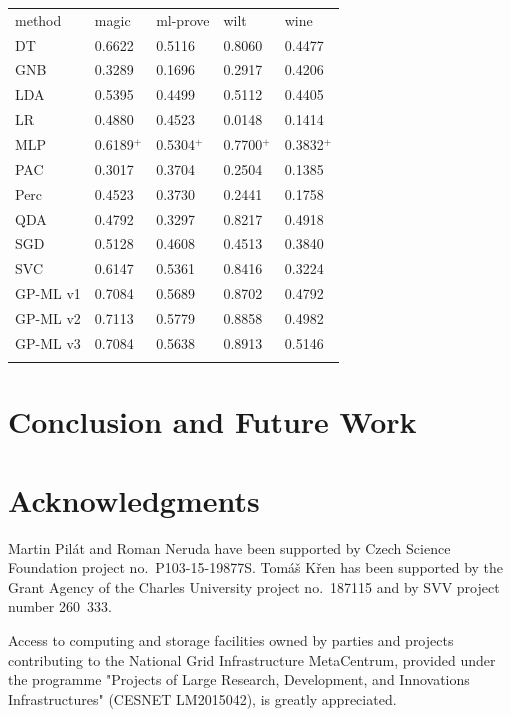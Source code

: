 \documentclass{ws-ijait}
\begin{document}
\begin{table}
{\begin{tabular}{lllll}
\toprule
method 						& magic 	& ml-prove 	& wilt 		& wine      \\
\colrule
DT 							& 0.6622 	& 0.5116 	& 0.8060 	& 0.4477    \\
GNB 						& 0.3289	& 0.1696 	& 0.2917 	& 0.4206    \\
LDA 						& 0.5395 	& 0.4499 	& 0.5112 	& 0.4405    \\
LR 							& 0.4880 	& 0.4523 	& 0.0148 	& 0.1414    \\
MLP 						& 0.6189$^+$& 0.5304$^+$& 0.7700$^+$& 0.3832$^+$\\
PAC 						& 0.3017 	& 0.3704 	& 0.2504 	& 0.1385    \\
Perc 						& 0.4523 	& 0.3730 	& 0.2441 	& 0.1758    \\
QDA 						& 0.4792    & 0.3297 	& 0.8217 	& 0.4918    \\
SGD 						& 0.5128 	& 0.4608 	& 0.4513 	& 0.3840    \\
SVC 						& 0.6147	& 0.5361 	& 0.8416 	& 0.3224    \\
\colrule
GP-ML v1\cite{SSCI2015} 	& 0.7084 	& 0.5689 	& 0.8702 	& 0.4792    \\
GP-ML v2\cite{7814654} 		& 0.7113	& 0.5779	& 0.8858 	& 0.4982    \\
GP-ML v3					& 0.7084	& 0.5638	& 0.8913	& 0.5146    \\			
\botrule
\end{tabular}}
\end{table} 

\section{Conclusion and Future Work}

\section*{Acknowledgments}

Martin Pil\'{a}t and Roman Neruda have been supported by Czech Science
Foundation project no.~P103-15-19877S. Tom\'a\v{s} K\v{r}en has been supported
by the Grant Agency of the Charles University project no.~187115 and by SVV
project number 260~333.

Access to computing and storage facilities owned by parties and projects
contributing to the National Grid Infrastructure MetaCentrum, provided under the
programme "Projects of Large Research, Development, and Innovations
Infrastructures" (CESNET LM2015042), is greatly appreciated.



\end{document}
